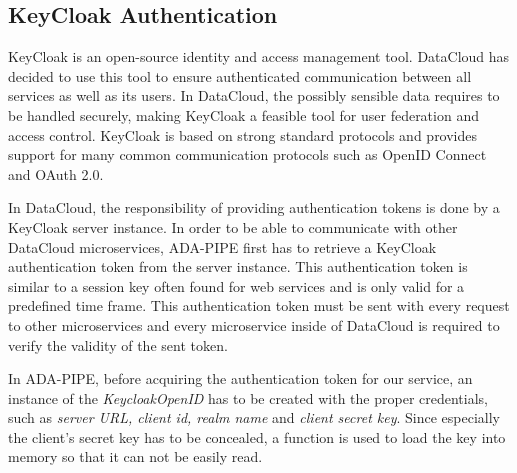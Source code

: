 \documentclass{article}
\begin{document}
        \subsection{KeyCloak Authentication}
        \label{sec:keycloak-server}

            KeyCloak \cite{keycloakDocumentationKeycloak} is an open-source identity and access management tool.
            DataCloud has decided to use this tool to ensure authenticated communication between all services as well as its users.
            In DataCloud, the possibly sensible data requires to be handled securely, making KeyCloak a feasible tool for user federation and access control. 
            KeyCloak is based on strong standard protocols and provides support for many common communication protocols such as OpenID Connect and OAuth 2.0.


            In DataCloud, the responsibility of providing authentication tokens is done by a KeyCloak server instance.
            In order to be able to communicate with other DataCloud microservices, ADA-PIPE first has to retrieve a KeyCloak authentication token from the server instance. This authentication token is similar to a session key often found for web services and is only valid for a predefined time frame. This authentication token must be sent with every request to other microservices and every microservice inside of DataCloud is required to verify the validity of the sent token.

            In ADA-PIPE, before acquiring the authentication token for our service, an instance of the \emph{KeycloakOpenID} has to be created with the proper credentials, such as \emph{server URL, client id, realm name} and \emph{client secret key}. Since especially the client's secret key has to be concealed, a function is used to load the key into memory so that it can not be easily read. 
            
\end{document}
